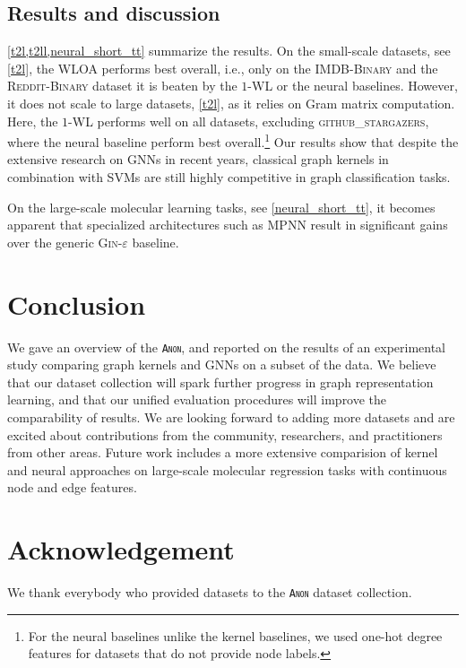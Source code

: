 \documentclass{article}
\theoremstyle{definition}
\begin{document}
\subsection{Results and discussion}
\cref{t2l,t2ll,neural_short_tt} summarize the results. On the small-scale datasets, see \cref{t2l}, the \textsc{WLOA} performs best overall, i.e., only on the \textsc{IMDB-Binary} and the \textsc{Reddit-Binary} dataset it is beaten by the $1$-\textsc{WL} or the neural baselines. However, it does not scale to large datasets, \cref{t2l}, as it relies on Gram matrix computation. Here, the $1$-WL performs well on all datasets, excluding \textsc{github\_stargazers}, where the neural baseline perform best overall.\footnote{For the neural baselines unlike the kernel baselines, we used one-hot degree features for datasets that do not provide node labels.}
Our results show that despite the extensive research on GNNs in recent years, classical graph kernels in combination with SVMs are still highly competitive in graph classification tasks.

On the large-scale molecular learning tasks, see \cref{neural_short_tt}, it becomes apparent that specialized architectures such as \textsc{MPNN} result in significant gains over the generic \textsc{Gin-$\varepsilon$} baseline. 


\section{Conclusion}

We gave an overview of the \textsc{\texttt{Anon}}, and reported on the results of an experimental study comparing graph kernels and GNNs on a subset of the data. We believe that our dataset collection will spark further progress in graph representation learning, and that our unified evaluation procedures will improve the comparability of results. We are looking forward to adding more datasets and are excited about contributions from the community, researchers, and practitioners from other areas. Future work includes a more extensive comparision of kernel and neural approaches on large-scale molecular regression tasks with continuous node and edge features.

\section{Acknowledgement}

We thank everybody who provided datasets to the  \textsc{\texttt{Anon}} dataset collection.
\end{document}
